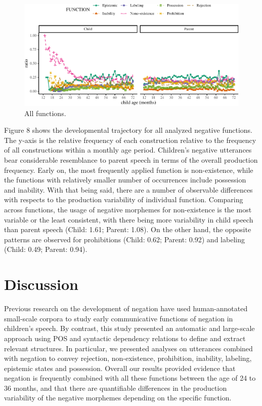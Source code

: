 \documentclass[10pt, letterpaper]{article}
\newenvironment{CodeChunk}{}{}
\begin{document}
\begin{figure}[h]
\begin{CodeChunk}


\begin{center}\includegraphics{figs/all-1} \end{center}

\end{CodeChunk}
\caption[This image spans both columns]{All functions.}\label{fig:all}
\end{figure}

Figure 8 shows the developmental trajectory for all analyzed negative
functions. The y-axis is the relative frequency of each construction
relative to the frequency of all constructions within a monthly age
period. Children's negative utterances bear considerable resemblance to
parent speech in terms of the overall production frequency. Early on,
the most frequently applied function is non-existence, while the
functions with relatively smaller number of occurrences include
possession and inability. With that being said, there are a number of
observable differences with respects to the production variability of
individual function. Comparing across functions, the usage of negative
morphemes for non-existence is the most variable or the least
consistent, with there being more variability in child speech than
parent speech (Child: 1.61; Parent: 1.08). On the other hand, the
opposite patterns are observed for prohibitions (Child: 0.62; Parent:
0.92) and labeling (Child: 0.49; Parent: 0.94).

\hypertarget{discussion}{%
\section{Discussion}\label{discussion}}

Previous research on the development of negation have used
human-annotated small-scale corpora to study early communicative
functions of negation in children's speech. By contrast, this study
presented an automatic and large-scale approach using POS and syntactic
dependency relations to define and extract relevant structures. In
particular, we presented analyses on utterances combined with negation
to convey rejection, non-existence, prohibition, inability, labeling,
epistemic states and possession. Overall our results provided evidence
that negation is frequently combined with all these functions between
the age of 24 to 36 months, and that there are quantifiable differences
in the production variability of the negative morphemes depending on the
specific function.
\end{document}
